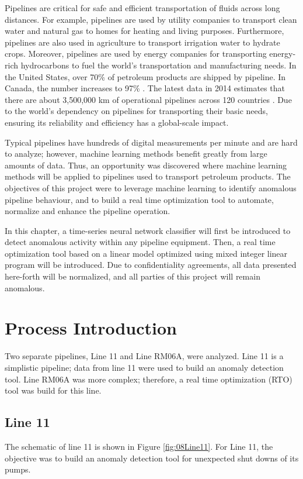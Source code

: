 Pipelines are critical for safe and efficient transportation of fluids across long distances.  For example, pipelines are used by utility companies to transport clean water and natural gas to homes for heating and living purposes.  Furthermore, pipelines are also used in agriculture to transport irrigation water to hydrate crops.  Moreover, pipelines are used by energy companies for transporting energy-rich hydrocarbons to fuel the world's transportation and manufacturing needs. In the United States, over 70\% of petroleum products are shipped by pipeline.  In Canada, the number increases to 97\% \cite{pipeline_transport}.  The latest data in 2014 estimates that there are about 3,500,000 km of operational pipelines across 120 countries \cite{CIA_pipeline}. Due to the world's dependency on pipelines for transporting their basic needs, ensuring its reliability and efficiency has a global-scale impact.

Typical pipelines have hundreds of digital measurements per minute and are hard to analyze; however, machine learning methods benefit greatly from large amounts of data. Thus, an opportunity was discovered where machine learning methods will be applied to pipelines used to transport petroleum products. The objectives of this project were to leverage machine learning to identify anomalous pipeline behaviour, and to build a real time optimization tool to automate, normalize and enhance the pipeline operation.

In this chapter, a time-series neural network classifier will first be introduced to detect anomalous activity within any pipeline equipment.  Then, a real time optimization tool based on a linear model optimized using mixed integer linear program will be introduced.  Due to confidentiality agreements, all data presented here-forth will be normalized, and all parties of this project will remain anomalous.

\section{Process Introduction}
Two separate pipelines, Line 11 and Line RM06A, were analyzed.  Line 11 is a simplistic pipeline; data from line 11 were used to build an anomaly detection tool.  Line RM06A was more complex; therefore, a real time optimization (RTO) tool was build for this line.

\subsection{Line 11}
The schematic of line 11 is shown in Figure \ref{fig:08Line11}. For Line 11, the objective was to build an anomaly detection tool for unexpected shut downs of its pumps.  

